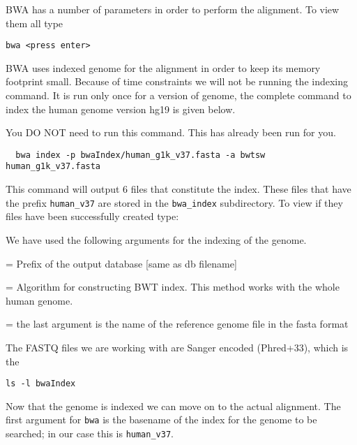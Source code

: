 \begin{steps}
BWA has a number of parameters in order to perform the alignment. To view them all type

\begin{lstlisting}
bwa <press enter> 
\end{lstlisting}

BWA uses indexed genome for the alignment in order to keep its memory footprint small. Because of time constraints we will not be running the indexing command. It is run only once for a version of genome, the complete command to index the human genome version hg19 is given below. 

\begin{warning}
  You DO NOT need to run this command. This has already been run for you.
  \begin{lstlisting}
  bwa index -p bwaIndex/human_g1k_v37.fasta -a bwtsw human_g1k_v37.fasta
  \end{lstlisting}
\end{warning}

This command will output 6 files that constitute the index. These files that have the prefix \texttt{human_v37} are stored in the \texttt{bwa\_index} subdirectory. To view if they files have been successfully created type:

We have used the following arguments for the indexing of the genome.
\begin{description}[style=multiline,labelindent=0cm,align=right,leftmargin=\descriptionlabelspace,rightmargin=1.5cm,font=\ttfamily]
  \item[-p] = Prefix of the output database [same as db filename] 
  \item[-a] = Algorithm for constructing BWT index. This method works with the whole human genome.
  \item[reference genome file name] = the last argument is the name of the reference genome file in the fasta format
\end{description}

The FASTQ files we are working with are Sanger encoded (Phred+33), which is the
\begin{lstlisting}
ls -l bwaIndex
\end{lstlisting}
\end{steps}

\begin{information}
Now that the genome is indexed we can move on to the actual alignment. The first
argument for \texttt{bwa} is the basename of the index for the genome to be searched;
in our case this is \texttt{human_v37}.

\end{information}

